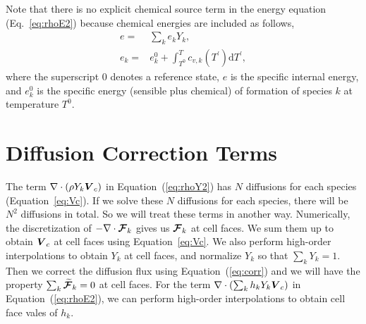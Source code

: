 \documentclass[11pt,letterpaper]{article}
\renewcommand{\vec}[1]{\mbox{\boldmath$#1$}}
\begin{document}
Note that there is no explicit chemical source term in the energy
equation (Eq.~\ref{eq:rhoE2}) because chemical energies are included as
follows,
\begin{align}
  e = { } & \sum_k e_k Y_k, \\
  e_k = { } & e_k^0 + \int_{T^0}^T c_{v,k}(T^\prime) \mathrm{d} T^\prime,
\end{align}
where the superscript $0$ denotes a reference state, $e$ is the
specific internal energy, and $e_k^0$ is the specific energy (sensible
plus chemical) of formation of species $k$ at temperature $T^0$.

\section{Diffusion Correction Terms}

The term $\nabla \cdot (\rho Y_k \vec{V}_c)$ in
Equation~(\ref{eq:rhoY2}) has $N$ diffusions for each species
(Equation~\ref{eq:Vc}).  If we solve these $N$ diffusions for each
species, there will be $N^2$ diffusions in total.  So we will treat
these terms in another way.  Numerically, the discretization of
$-\nabla \cdot \vec{\mathcal{F}}_k$ gives us $\vec{\mathcal{F}}_k$ at
cell faces.  We sum them up to obtain $\vec{V}_c$ at cell faces using
Equation~\ref{eq:Vc}.  We also perform high-order interpolations to
obtain $Y_k$ at cell faces, and normalize $Y_k$ so that $\sum_k Y_k =
1$.  Then we correct the diffusion flux using Equation~(\ref{eq:corr})
and we will have the property $\sum_k \vec{\widetilde{\mathcal{F}}}_k
= 0$ at cell faces.  For the term $\nabla \cdot (\sum_k h_k Y_k
\vec{V}_c)$ in Equation~(\ref{eq:rhoE2}), we can perform high-order
interpolations to obtain cell face vales of $h_k$.
\end{document}
